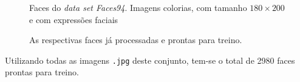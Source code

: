 \documentclass[10pt, conference]{IEEEtran}
\begin{document}
				\begin{figure}[h]
					\centering
					\qquad
					\caption{Faces do \textit{data set Faces94}. Imagens colorias, com tamanho $ 180 \times 200 $ e com expressões faciais}%
					\label{fig:94_colored}%
				\end{figure}
				
				\begin{figure}[h]
					\centering
					\qquad
					\caption{As respectivas faces já processadas e prontas para treino.}%
					\label{fig:94_cut}%
				\end{figure}
			
				Utilizando todas as imagens \texttt{.jpg} deste conjunto, tem-se o total de 2980 faces prontas para treino.
\end{document}
